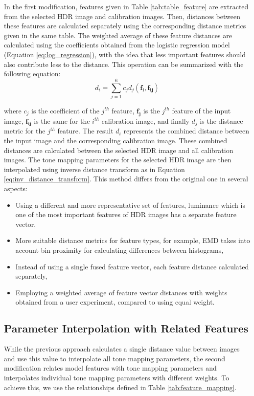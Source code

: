 In the first modification, features given in Table \ref{tab:table_feature} are extracted from the selected HDR image and calibration images. Then, distances between these features are calculated separately using the corresponding distance metrics given in the same table. The weighted average of these feature distances are calculated using the coefficients obtained from the logistic regression model (Equation \ref{eq:log_regression}), with the idea that less important features should also contribute less to the distance. This operation can be summarized with the following equation:
\begin{equation}
    d_i = \sum_{j=1}^{6}c_j d_j(\mathbf{f_i}, \mathbf{f_{ij}})
\end{equation}

where $c_j$ is the coefficient of the $j^{th}$ feature, $\mathbf{f_j}$ is the $j^{th}$ feature of the input image, $\mathbf{f_{ij}}$ is the same for the $i^{th}$ calibration image, and finally $d_j$ is the distance metric for the $j^{th}$ feature. The result $d_i$ represents the combined distance between the input image and the corresponding calibration image. These combined distances are calculated between the selected HDR image and all calibration images. The tone mapping parameters for the selected HDR image are then interpolated using inverse distance transform as in Equation \ref{eq:inv_distance_transform}. This method differs from the original one in several aspects: 

\begin{itemize}
    \item Using a different and more representative set of features, luminance which is one of the most important features of HDR images has a separate feature vector,
    \item More suitable distance metrics for feature types, for example, EMD takes into account bin proximity for calculating differences between histograms,
    \item Instead of using a single fused feature vector, each feature distance calculated separately,
    \item Employing a weighted average of feature vector distances with weights obtained from a user experiment, compared to using equal weight.
\end{itemize}


\subsection{Parameter Interpolation with Related Features}
While the previous approach calculates a single distance value between images and use this value to interpolate all tone mapping parameters, the second modification relates model features with tone mapping parameters and interpolates individual tone mapping parameters with different weights. To achieve this, we use the relationships defined in Table \ref{tab:feature_mapping}.

